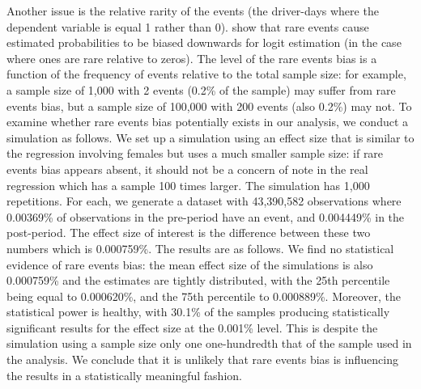 Another issue is the relative rarity of the events 
(the driver-days where the dependent variable is equal 1 rather than 0). 
\citet{kingzheng2001}
show that rare events cause estimated probabilities to be biased downwards for logit estimation 
(in the case where ones are rare relative to zeros). 
The level of the rare events bias is a function of 
the frequency of events relative to the total sample size: 
for example, a sample size of 1,000 with 2 events (0.2\% of the sample) 
may suffer from rare events bias, 
but a sample size of 100,000 with 200 events (also 0.2\%) may not. 
To examine whether rare events bias potentially exists in our analysis, 
we conduct a simulation as follows. 
We set up a simulation using an effect size that is similar to the regression involving females but uses a much smaller sample size: 
if rare events bias appears absent, 
it should not be a concern of note in the real regression 
which has a sample 100 times larger. 
The simulation has 1,000 repetitions. 
For each, we generate a dataset with 43,390,582 observations 
where 0.00369\% of observations in the pre-period have an event, 
and 0.004449\% in the post-period. 
The effect size of interest is the difference between these two numbers which is 0.000759\%. 
The results are as follows. 
We find no statistical evidence of rare events bias: 
the mean effect size of the simulations is also 0.000759\% 
and the estimates are tightly distributed, 
with the 25th percentile being equal to 0.000620\%, 
and the 75th percentile to 0.000889\%. 
Moreover, the statistical power is healthy, 
with 30.1\% of the samples producing statistically significant results 
for the effect size at the 0.001\% level. 
This is despite the simulation using a sample size only one one-hundredth 
that of the sample used in the analysis. 
We conclude that it is unlikely that rare events bias 
is influencing the results in a statistically meaningful fashion.






